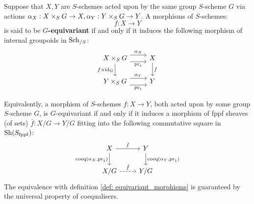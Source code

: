         \begin{definition} \label{def: equivariant_morphisms}
            Suppose that $X, Y$ are $S$-schemes acted upon by the same group $S$-scheme $G$ via actions $\alpha_X: X \x_S G \to X, \alpha_Y: Y \x_S G \to Y$. A morphisms of $S$-schemes:
                $$f: X \to Y$$
            is said to be \textbf{$G$-equivariant} if and only if it induces the following morphism of internal groupoids in $\mathrm{Sch}_{/S}$:
                $$
                    \begin{tikzcd}
                	{X \x_S G} & X \\
                	{Y \x_S G} & Y
                	\arrow["f", from=1-2, to=2-2]
                	\arrow["{f \x \id_G}"', from=1-1, to=2-1]
                	\arrow["{\pr_1}"', shift right=2, from=1-1, to=1-2]
                	\arrow["{\pr_1}"', shift right=2, from=2-1, to=2-2]
                	\arrow["{\alpha_X}", shift left=2, from=1-1, to=1-2]
                	\arrow["{\alpha_Y}", shift left=2, from=2-1, to=2-2]
                    \end{tikzcd}
                $$
        \end{definition}
        \begin{remark}
            Equivalently, a morphism of $S$-schemes $f: X \to Y$, both acted upon by some group $S$-scheme $G$, is $G$-equivariant if and only if it induces a morphism of fppf sheaves (of sets) $\bar{f}: X/G \to Y/G$ fitting into the following commutative square in $\mathrm{Sh}(S_{\mathrm{fppf}})$:
                $$
                    \begin{tikzcd}
                	X & Y \\
                	{X/G} & {Y/G}
                	\arrow["{\coeq(\alpha_X, \pr_1)}"', from=1-1, to=2-1]
                	\arrow["{\bar{f}}", dashed, from=2-1, to=2-2]
                	\arrow["f", from=1-1, to=1-2]
                	\arrow["{\coeq(\alpha_Y, \pr_1)}", from=1-2, to=2-2]
                    \end{tikzcd}
                $$
            The equivalence with definition \ref{def: equivariant_morphisms} is guaranteed by the universal property of coequalisers. 
        \end{remark}
